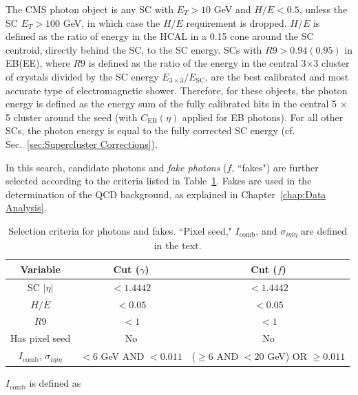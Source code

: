 \documentclass[dissertation.tex]{subfiles}
\begin{document}
The CMS photon object is any SC with $E_{T} > 10$ GeV and $H/E < 0.5$, unless the SC $E_{T} > 100$ GeV, in which case the $H/E$ requirement is dropped.  $H/E$ is defined as the ratio of energy in the HCAL in a 0.15 cone around the SC centroid, directly behind the SC, to the SC energy.  SCs with $R9 > 0.94(0.95)$ in EB(EE), where $R9$ is defined as the ratio of the energy in the central 3$\times$3 cluster of crystals divided by the SC energy $E_{3\times 3}/E_{\mathrm{SC}}$, are the best calibrated and most accurate type of electromagnetic shower.  Therefore, for these objects, the photon energy is defined as the energy sum of the fully calibrated hits in the central 5 $\times$ 5 cluster around the seed (with $C_{\mathrm{EB}}(\eta)$ applied for EB photons).  For all other SCs, the photon energy is equal to the fully corrected SC energy (cf. Sec.~\ref{sec:Supercluster Corrections}).

In this search, candidate photons and \textit{fake photons} ($\mathit{f}$, ``fakes") are further selected according to the criteria listed in Table~\ref{tab:g_f_criteria}.  Fakes are used in the determination of the QCD background, as explained in Chapter~\ref{chap:Data Analysis}.

\begin{table}[hcbp]
\caption{Selection criteria for photons and fakes.  ``Pixel seed," $I_{\mathrm{comb}}$, and $\sigma_{i\eta i\eta}$ are defined in the text.}
\centering
\begin{tabular}{|c|c|c|}
\hline
Variable & Cut ($\gamma$) & Cut ($\mathit{f}$) \\
\hline
\hline
SC $|\eta|$ & $< 1.4442$ & $<1.4442$ \\
\hline
$H/E$ & $<0.05$ & $<0.05$ \\
\hline
$R9$ & $< 1$ & $< 1$ \\
\hline
Has pixel seed & No & No \\
\hline
$I_{\mathrm{comb}}$, $\sigma_{i\eta i\eta}$ & $< 6$ GeV AND $< 0.011$ & ($\geq 6$ AND $< 20$ GeV) OR $\geq 0.011$ \\
\hline
\end{tabular}
\label{tab:g_f_criteria}
\end{table}

\marginpar{\textcolor{blue}{Updated effective area}}$I_{\mathrm{comb}}$ is defined as
\end{document}
